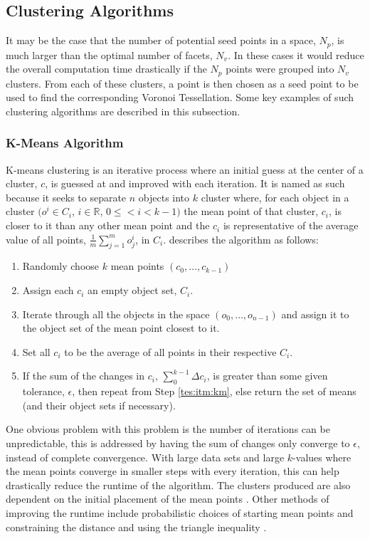 \subsection{Clustering Algorithms} \label{tes:sec:clu}
It may be the case that the number of potential seed points in a space, $N_p$, is much larger than the optimal number of facets, $N_v$. In these cases it would reduce the overall computation time drastically if the $N_p$ points were grouped into $N_v$ clusters. From each of these clusters, a point is then chosen as a seed point to be used to find the corresponding Voronoi Tessellation. Some key examples of such clustering algorithms are described in this subsection.
%
\subsubsection{K-Means Algorithm}\label{tes:ssec:kma}
K-means clustering is an iterative process where an initial guess at the center of a cluster, $c$, is guessed at and improved with each iteration. It is named as such because it seeks to separate $n$ objects into $k$ cluster where, for each object in a cluster $( o^i \in C_i$, $i \in \mathbb{R}$, $0\leq<i<k-1)$ the mean point of that cluster, $c_i$, is closer to it than any other mean point and the $c_i$ is representative of the average value of all points, $\frac{1}{m}\sum^m_{j=1}o^i_j$, in $C_i$. \citet{way2012advances} describes the algorithm as follows:
\begin{enumerate}
  \item	Randomly choose $k$ mean points $(c_0,\dots,c_{k-1})$
  \item\label{tes:itm:km} Assign each $c_i$ an empty object set, $C_i$.
  \item Iterate through all the objects in the space $(o_0,\dots,o_{n-1})$ and assign it to the object set of the mean point closest to it.
  \item Set all $c_i$ to be the average of all points in their respective $C_i$.
  \item If the sum of the changes in $c_i$, $\sum_0^{k-1} \Delta c_i$, is greater than some given tolerance, $\epsilon$, then repeat from Step \ref{tes:itm:km}, else return the set of means (and their object sets if 	      necessary).
\end{enumerate}
One obvious problem with this problem is the number of iterations can be unpredictable, this is addressed by having the sum of changes only converge to $\epsilon$, instead of complete convergence. With large data sets and large $k$-values where the mean points converge in smaller steps with every iteration, this can help drastically reduce the runtime of the algorithm. The clusters produced are also dependent on the initial placement of the mean points \citep{way2012advances}. Other methods of improving the runtime include probabilistic choices of starting mean points \citep{arthur2007k} and constraining the distance and using the triangle inequality \citep{hamerly2010making}.
%
